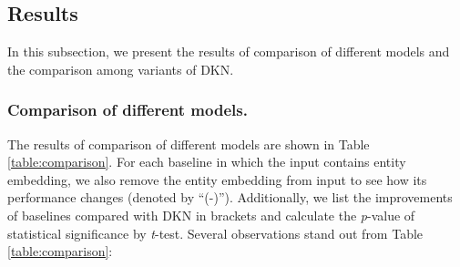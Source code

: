 \documentclass[sigconf]{acmart}
\begin{document}
	\subsection{Results}
	\label{sec:cm}
		In this subsection, we present the results of comparison of different models and the comparison among variants of DKN.
	
		\subsubsection{Comparison of different models.}
			The results of comparison of different models are shown in Table \ref{table:comparison}.
			For each baseline in which the input contains entity embedding, we also remove the entity embedding from input to see how its performance changes (denoted by ``(-)'').
			Additionally, we list the improvements of baselines compared with DKN in brackets and calculate the \textit{p}-value of statistical significance by \textit{t}-test.
			Several observations stand out from Table \ref{table:comparison}:
\end{document}

